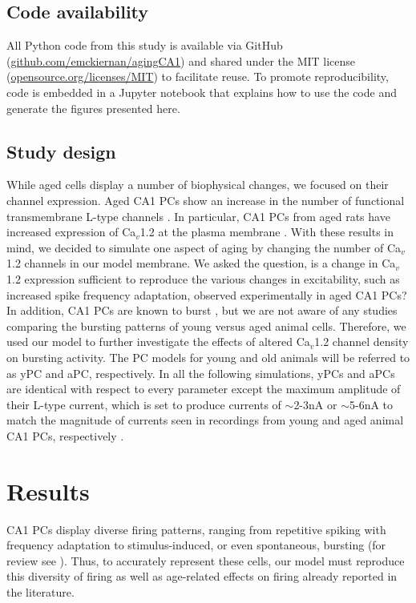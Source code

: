 \documentclass[12pt]{article}
\begin{document}
\subsection{Code availability}
All Python code from this study is available via GitHub (\href{https://github.com/emckiernan/agingCA1}{github.com/emckiernan/agingCA1}) and shared under the MIT license (\href{https://opensource.org/licenses/MIT}{opensource.org/licenses/MIT}) to facilitate reuse. To promote reproducibility, code is embedded in a Jupyter notebook \cite{perez2007ipython,kluyver2016jupyter} that explains how to use the code and generate the figures presented here.

\subsection{Study design}
While aged cells display a number of biophysical changes, we focused on their {\Ca} channel expression. Aged CA1 PCs show an increase in the number of functional transmembrane L-type {\Ca} channels  \citep{chen2000expression,herman1998up,thibault1996increase,veng2002regionally,veng2003age}. In particular, CA1 PCs from aged rats have increased expression of Ca$_v$1.2 at the plasma membrane \citep{nunez2014surface}. With these results in mind, we decided to simulate one aspect of aging by changing the number of Ca$_v$1.2 channels in our model membrane. We asked the question, is a change in Ca$_v$1.2 expression sufficient to reproduce the various changes in excitability, such as increased spike frequency adaptation, observed experimentally in aged CA1 PCs? In addition, CA1 PCs are known to burst \citep{mckiernan2017ca1}, but we are not aware of any studies comparing the bursting patterns of young versus aged animal cells. Therefore, we used our model to further investigate the effects of altered Ca$_v$1.2 channel density on bursting activity. The PC models for young and old animals will be referred to as yPC and aPC, respectively. In all the following simulations, yPCs and aPCs are identical with respect to every parameter except the maximum amplitude of their L-type {\Ca} current, which is set to produce currents of $\sim$2-3nA or $\sim$5-6nA to match the magnitude of currents seen in recordings from young and aged animal CA1 PCs, respectively \cite{campbell1996aging}. 

\section{Results}
CA1 PCs display diverse firing patterns, ranging from repetitive spiking with frequency adaptation to stimulus-induced, or even spontaneous, bursting (for review see \cite{mckiernan2017ca1}). Thus, to accurately represent these cells, our model must reproduce this diversity of firing as well as age-related effects on firing already reported in the literature.  
\end{document}
